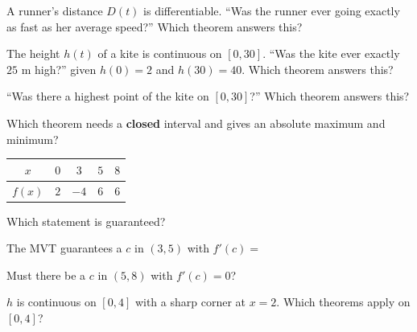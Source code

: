 \begin{exo}{}
A runner's distance $D(t)$ is differentiable. ``Was the runner ever going exactly as fast as her average speed?'' Which theorem answers this?
\end{exo}
\begin{exo}{}
The height $h(t)$ of a kite is continuous on $[0,30]$. ``Was the kite ever exactly $25$ m high?'' given $h(0)=2$ and $h(30)=40$. Which theorem answers this?
\end{exo}
\begin{exo}{}
``Was there a highest point of the kite on $[0,30]$?'' Which theorem answers this?
\end{exo}
\begin{exo}{}
Which theorem needs a \textbf{closed} interval and gives an absolute maximum and minimum?
\end{exo}
\begin{center}\begin{tabular}{|c|c|c|c|c|}\hline$x$&$0$&$3$&$5$&$8$\\\hline$f(x)$&$2$&$-4$&$6$&$6$\\\hline\end{tabular}\end{center}
\begin{exo}{}
Which statement is guaranteed?
\end{exo}
\begin{exo}{}
The MVT guarantees a $c$ in $(3,5)$ with $f'(c)=$
\end{exo}
\begin{exo}{}
Must there be a $c$ in $(5,8)$ with $f'(c)=0$?
\end{exo}
\begin{exo}{}
$h$ is continuous on $[0,4]$ with a sharp corner at $x=2$. Which theorems apply on $[0,4]$?
\end{exo}
